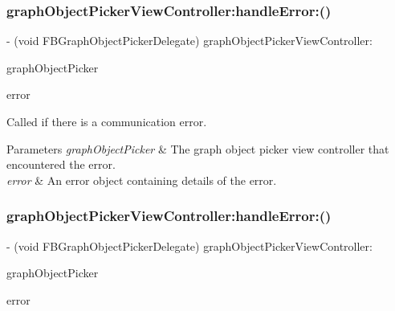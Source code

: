 \subsubsection{\texorpdfstring{graph\+Object\+Picker\+View\+Controller\+:handle\+Error\+:()}{graphObjectPickerViewController:handleError:()}\hspace{0.1cm}{\footnotesize\ttfamily [4/5]}}
{\footnotesize\ttfamily -\/ (void F\+B\+Graph\+Object\+Picker\+Delegate) graph\+Object\+Picker\+View\+Controller\+: \begin{DoxyParamCaption}\item[{(\hyperlink{interfaceFBGraphObjectPickerViewController}{F\+B\+Graph\+Object\+Picker\+View\+Controller} $\ast$)}]{graph\+Object\+Picker }\item[{handleError:(N\+S\+Error $\ast$)}]{error }\end{DoxyParamCaption}\hspace{0.3cm}{\ttfamily [optional]}}

Called if there is a communication error.


\begin{DoxyParams}{Parameters}
{\em graph\+Object\+Picker} & The graph object picker view controller that encountered the error. \\
\hline
{\em error} & An error object containing details of the error. \\
\hline
\end{DoxyParams}
\mbox{\label{protocolFBGraphObjectPickerDelegate_01-p_a99107978ecbc60a1a7daeeb2367d5cbf}} 
\subsubsection{\texorpdfstring{graph\+Object\+Picker\+View\+Controller\+:handle\+Error\+:()}{graphObjectPickerViewController:handleError:()}\hspace{0.1cm}{\footnotesize\ttfamily [5/5]}}
{\footnotesize\ttfamily -\/ (void F\+B\+Graph\+Object\+Picker\+Delegate) graph\+Object\+Picker\+View\+Controller\+: \begin{DoxyParamCaption}\item[{(\hyperlink{interfaceFBGraphObjectPickerViewController}{F\+B\+Graph\+Object\+Picker\+View\+Controller} $\ast$)}]{graph\+Object\+Picker }\item[{handleError:(N\+S\+Error $\ast$)}]{error }\end{DoxyParamCaption}\hspace{0.3cm}{\ttfamily [optional]}}

